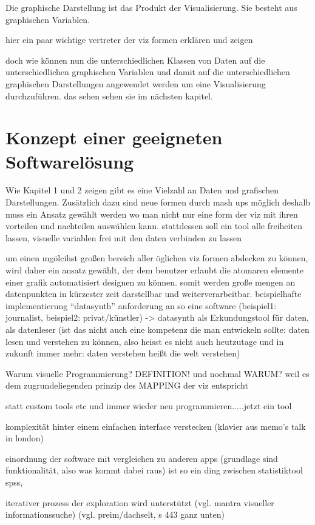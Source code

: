 \documentclass[a4paper, 12pt, DIVcalc, onepage, pdftex, headsepline, footsepline]{scrreprt}
\begin{document}
Die graphische Darstellung ist das Produkt der Visualisierung. Sie besteht 
aus graphischen Variablen.

hier ein paar wichtige vertreter der viz formen erklären und zeigen

doch wie können nun die unterschiedlichen Klassen von Daten auf die unterschiedlichen graphischen Variablen und damit
auf die unterschiedlichen graphischen Darstellungen angewendet werden um eine Visualisierung durchzuführen. das sehen
sehen sie im nächsten kapitel.

\chapter{Konzept einer geeigneten Softwarelösung}
\label{cha:Software}
Wie Kapitel 1 und 2 zeigen gibt es eine Vielzahl an Daten und grafischen
Darstellungen. Zusätzlich dazu sind neue formen durch mash ups möglich
deshalb muss ein Ansatz gewählt werden  wo man nicht nur eine form der viz mit ihren vorteilen und nachteilen auswählen kann.
stattdessen soll ein tool alle freiheiten lassen, visuelle variablen frei mit den daten verbinden zu lassen


um einen mgölcihst großen bereich aller öglichen viz formen abdecken zu können, wird daher ein ansatz gewählt, der dem benutzer erlaubt die atomaren elemente einer grafik automatisiert designen zu können. somit werden große mengen an datenpunkten in kürzester zeit darstellbar und weiterverarbeitbar.
beispielhafte implementierung “datasynth”
anforderung an so eine software (beispiel1: journalist, beispiel2: privat/künstler)
-> datasynth als Erkundungstool für daten, als datenleser (ist das nicht auch eine kompetenz die man entwickeln sollte: daten lesen und verstehen zu können, also heisst es nicht auch heutzutage und in zukunft immer mehr: daten verstehen heißt die welt verstehen)

Warum visuelle Programmierung? DEFINITION! und nochmal WARUM?
weil es dem zugrundeliegenden prinzip des MAPPING der viz entspricht

statt custom tools etc und immer wieder neu programmieren.....jetzt ein tool

komplexität hinter einem einfachen interface verstecken (klavier aus memo’s talk in london)

einordnung der software mit vergleichen zu anderen apps (grundlage sind funktionalität, also was kommt dabei raus) ist so ein ding zwischen statistiktool spss, 

iterativer prozess der exploration wird unterstützt (vgl. mantra visueller informationssuche) (vgl. preim/dachselt, s 443 ganz unten)
\end{document}
